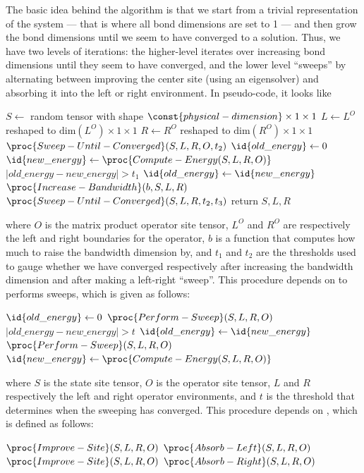 \documentclass{article}
\begin{document}
The basic idea behind the algorithm is that we start from a trivial representation of the system --- that is where all bond dimensions are set to 1 --- and then grow the bond dimensions until we seem to have converged to a solution.  Thus, we have two levels of iterations:  the higher-level iterates over increasing bond dimensions until they seem to have converged, and the lower level ``sweeps'' by alternating between improving the center site (using an eigensolver) and absorbing it into the left or right environment.  In pseudo-code, it looks like
\begin{codebox}
\li $S \gets$ random tensor with shape $\const{physical-dimension}\times1\times 1$
\li $L \gets L^O$ reshaped to $\text{dim}(L^O)\times1\times1$
\li $R \gets R^O$ reshaped to $\text{dim}(R^O)\times1\times1$
\li $\proc{Sweep-Until-Converged}(S,L,R,O,t_2)$
\li $\id{old\_energy} \gets 0$
\li $\id{new\_energy} \gets  \proc{Compute-Energy(S,L,R,O)}$
\li \While $|old\_energy-new\_energy| > t_1$
\li     \Do
\li         $\id{old\_energy} \gets \id{new\_energy}$
\li         $\proc{Increase-Bandwidth}(b,S,L,R)$
\li         $\proc{Sweep-Until-Converged}(S,L,R,t_2,t_3)$
\End
\li return $S,L,R$
\end{codebox}
where $O$ is the matrix product operator site tensor, $L^O$ and $R^O$ are respectively the left and right boundaries for the operator, $b$ is a function that computes how much to raise the bandwidth dimension by, and $t_1$ and $t_2$ are the thresholds used to gauge whether we have converged respectively after increasing the bandwidth dimension and after making a left-right ``sweep''.  This procedure depends on  to performs sweeps, which is given as follows:
\begin{codebox}
\li $\id{old\_energy} \gets 0$
\li $\proc{Perform-Sweep}(S,L,R,O)$
\li \While $|old\_energy-new\_energy| > t$
\li     \Do
\li         $\id{old\_energy} \gets \id{new\_energy}$
\li         $\proc{Perform-Sweep}(S,L,R,O)$
\li         $\id{new\_energy} \gets  \proc{Compute-Energy(S,L,R,O)}$
\end{codebox}
where $S$ is the state site tensor, $O$ is the operator site tensor, $L$ and $R$ respectively the left and right operator environments, and $t$ is the threshold that determines when the sweeping has converged.  This procedure depends on , which is defined as follows:
\begin{codebox}
\li $\proc{Improve-Site}(S,L,R,O)$
\li $\proc{Absorb-Left}(S,L,R,O)$
\li $\proc{Improve-Site}(S,L,R,O)$
\li $\proc{Absorb-Right}(S,L,R,O)$
\end{codebox}
\end{document}
